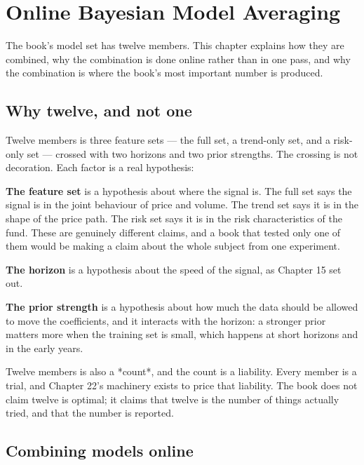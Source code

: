 
\chapter{Online Bayesian Model Averaging}
\label{ch:ensemble}

The book's model set has twelve members. This chapter explains how they
are combined, why the combination is done online rather than in one pass,
and why the combination is where the book's most important number is
produced.

\section{Why twelve, and not one}

Twelve members is three feature sets --- the full set, a trend-only set,
and a risk-only set --- crossed with two horizons and two prior
strengths. The crossing is not decoration. Each factor is a real
hypothesis:

\textbf{The feature set} is a hypothesis about where the signal is. The
full set says the signal is in the joint behaviour of price and volume.
The trend set says it is in the shape of the price path. The risk set says
it is in the risk characteristics of the fund. These are genuinely
different claims, and a book that tested only one of them would be making
a claim about the whole subject from one experiment.

\textbf{The horizon} is a hypothesis about the speed of the signal, as
Chapter 15 set out.

\textbf{The prior strength} is a hypothesis about how much the data should
be allowed to move the coefficients, and it interacts with the horizon: a
stronger prior matters more when the training set is small, which happens
at short horizons and in the early years.

Twelve members is also a *count*, and the count is a liability. Every
member is a trial, and Chapter 22's machinery exists to price that
liability. The book does not claim twelve is optimal; it claims that
twelve is the number of things actually tried, and that the number is
reported.

\section{Combining models online}

